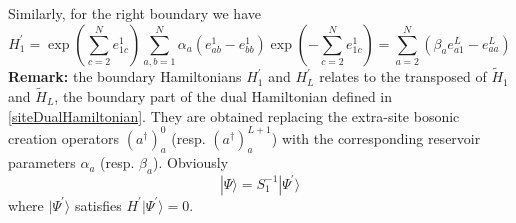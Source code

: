 \documentclass[11pt]{article}
\numberwithin{equation}{section}
\numberwithin{equation}{subsection}
\begin{document}
Similarly, for the right boundary we have 
\begin{equation}
H_{1}^{'}=\exp{\left(\sum_{c=2}^{N}e_{1c}^{1}\right)}\sum_{a,b=1}^{N}\alpha_{a}\left(e_{ab}^{1}-e_{bb}^{1}\right)\exp{\left(-\sum_{c=2}^{N}e_{1c}^{1}\right)}=\sum_{a=2}^{N}\left(\beta_{a}e_{a1}^{L}-e_{aa}^{L}\right)
\end{equation}
\textbf{Remark:} the boundary Hamiltonians $H_{1}^{'}$ and $H_{L}^{'}$ relates to the transposed of  $\widetilde{H}_{1}$ and $\widetilde{H}_{L}$, the boundary part of the dual Hamiltonian  defined in \eqref{siteDualHamiltonian}. They are obtained replacing the  extra-site bosonic creation operators $(a^{\dagger})_{a}^{0}$  (resp. $(a^{\dagger})_{a}^{L+1}$) with the corresponding reservoir parameters $\alpha_a$ (resp. $\beta_a$).
\newline\newline
Obviously
\begin{equation}\label{S1-Inverse}
	|\Psi\rangle =S_{1}^{-1}|\Psi^{'}\rangle
\end{equation}
where $|\Psi^{'}\rangle$ satisfies $H^{'}|\Psi^{'}\rangle=0$.
\end{document}
